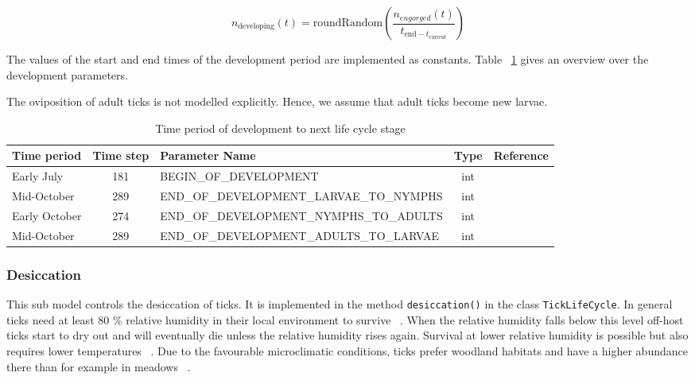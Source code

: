 \documentclass[a4paper, 11pt]{scrartcl}
\newcommand{\inlinecode}[1]{\texttt{\small #1}}
\begin{document}
\begin{equation}
n_{\text{developing}}(t) = \text{roundRandom}(\frac{n_{engorged}(t)}{t_{\text{end} - t_{\text{current}}}})
\end{equation}

The values of the start and end times of the development period are implemented as constants. Table ~\ref{tab:development_parameters} gives an overview over the development parameters.

The oviposition of adult ticks is not modelled explicitly. Hence, we assume that adult ticks become new larvae.

\begin{table}[h!]
\caption{Time period of development to next life cycle stage}
\label{tab:development_parameters}
\begin{tabularx}{\textwidth}{lclcl}
\toprule
\textbf{Time period} 	& \textbf{Time step} & \textbf{Parameter Name}							& \textbf{Type}    & \textbf{Reference} \\
\midrule
Early July   			& 181   			 & \tiny{BEGIN\_OF\_DEVELOPMENT}					& int      & \cite{tba}   		\\
Mid-October     		& 289      			 & \tiny{END\_OF\_DEVELOPMENT\_LARVAE\_TO\_NYMPHS}	& int      & \cite{tba}      	\\
Early October    		& 274    			 & \tiny{END\_OF\_DEVELOPMENT\_NYMPHS\_TO\_ADULTS}	& int      & \cite{tba}     	\\
Mid-October     		& 289      			 & \tiny{END\_OF\_DEVELOPMENT\_ADULTS\_TO\_LARVAE}	& int      & \cite{tba}        \\
\bottomrule
\end{tabularx}
\end{table}

\subsubsection{Desiccation}
This sub model controls the desiccation of ticks. It is implemented in the method \inlinecode{desiccation()} in the class \inlinecode{TickLifeCycle}. In general ticks need at least 80 \% relative humidity in their local environment to survive ~\parencite{Medlock.2013, Gray.2016, Hauser.2018}. When the relative humidity falls below this level off-host ticks start to dry out and will eventually die unless the relative humidity rises again. Survival at lower relative humidity is possible but also requires lower temperatures ~\parencite{Ostfeld.2015}. Due to the favourable microclimatic conditions, ticks prefer woodland habitats and have a higher abundance there than for example in meadows ~\parencite{Lindstrom.2003, Boehnke.2015}.
\end{document}
